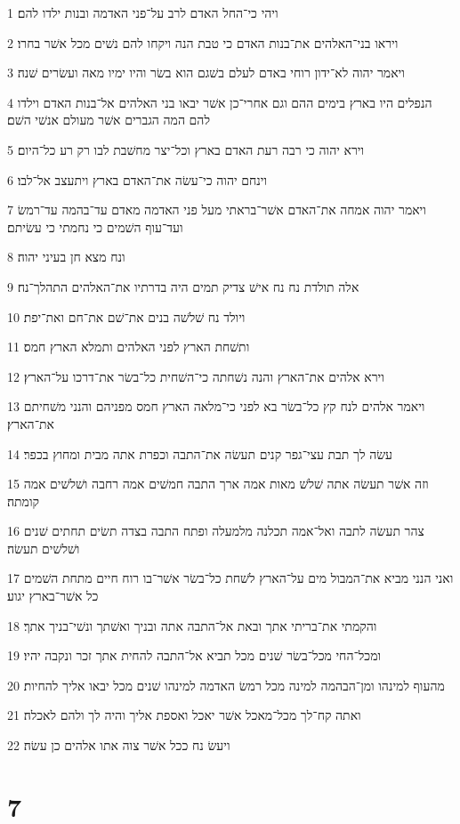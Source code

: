 \par 1 ויהי כי־החל האדם לרב על־פני האדמה ובנות ילדו להם׃
\par 2 ויראו בני־האלהים את־בנות האדם כי טבת הנה ויקחו להם נשׁים מכל אשׁר בחרו׃
\par 3 ויאמר יהוה לא־ידון רוחי באדם לעלם בשׁגם הוא בשׂר והיו ימיו מאה ועשׂרים שׁנה׃
\par 4 הנפלים היו בארץ בימים ההם וגם אחרי־כן אשׁר יבאו בני האלהים אל־בנות האדם וילדו להם המה הגברים אשׁר מעולם אנשׁי השׁם׃
\par 5 וירא יהוה כי רבה רעת האדם בארץ וכל־יצר מחשׁבת לבו רק רע כל־היום׃
\par 6 וינחם יהוה כי־עשׂה את־האדם בארץ ויתעצב אל־לבו׃
\par 7 ויאמר יהוה אמחה את־האדם אשׁר־בראתי מעל פני האדמה מאדם עד־בהמה עד־רמשׂ ועד־עוף השׁמים כי נחמתי כי עשׂיתם׃
\par 8 ונח מצא חן בעיני יהוה׃
\par 9 אלה תולדת נח נח אישׁ צדיק תמים היה בדרתיו את־האלהים התהלך־נח׃
\par 10 ויולד נח שׁלשׁה בנים את־שׁם את־חם ואת־יפת׃
\par 11 ותשׁחת הארץ לפני האלהים ותמלא הארץ חמס׃
\par 12 וירא אלהים את־הארץ והנה נשׁחתה כי־השׁחית כל־בשׂר את־דרכו על־הארץ׃
\par 13 ויאמר אלהים לנח קץ כל־בשׂר בא לפני כי־מלאה הארץ חמס מפניהם והנני משׁחיתם את־הארץ׃
\par 14 עשׂה לך תבת עצי־גפר קנים תעשׂה את־התבה וכפרת אתה מבית ומחוץ בכפר׃
\par 15 וזה אשׁר תעשׂה אתה שׁלשׁ מאות אמה ארך התבה חמשׁים אמה רחבה ושׁלשׁים אמה קומתה׃
\par 16 צהר תעשׂה לתבה ואל־אמה תכלנה מלמעלה ופתח התבה בצדה תשׂים תחתים שׁנים ושׁלשׁים תעשׂה׃
\par 17 ואני הנני מביא את־המבול מים על־הארץ לשׁחת כל־בשׂר אשׁר־בו רוח חיים מתחת השׁמים כל אשׁר־בארץ יגוע׃
\par 18 והקמתי את־בריתי אתך ובאת אל־התבה אתה ובניך ואשׁתך ונשׁי־בניך אתך׃
\par 19 ומכל־החי מכל־בשׂר שׁנים מכל תביא אל־התבה להחית אתך זכר ונקבה יהיו׃
\par 20 מהעוף למינהו ומן־הבהמה למינה מכל רמשׂ האדמה למינהו שׁנים מכל יבאו אליך להחיות׃
\par 21 ואתה קח־לך מכל־מאכל אשׁר יאכל ואספת אליך והיה לך ולהם לאכלה׃
\par 22 ויעשׂ נח ככל אשׁר צוה אתו אלהים כן עשׂה׃

\chapter{7}

